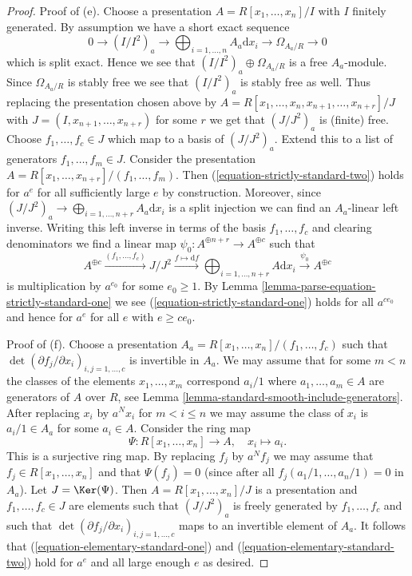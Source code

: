 \begin{proof}
\medskip\noindent
Proof of (e). Choose a presentation
$A = R[x_1, \ldots, x_n]/I$ with $I$ finitely generated.
By assumption we have a short exact sequence
$$
0 \to (I/I^2)_a \to \bigoplus\nolimits_{i = 1, \ldots, n} A_a\text{d}x_i \to
\Omega_{A_a/R} \to 0
$$
which is split exact. Hence we see that
$(I/I^2)_a \oplus \Omega_{A_a/R}$ is a free $A_a$-module.
Since $\Omega_{A_a/R}$ is stably free we see that $(I/I^2)_a$
is stably free as well. Thus replacing the presentation chosen
above by $A = R[x_1, \ldots, x_n, x_{n + 1}, \ldots, x_{n + r}]/J$ with
$J = (I, x_{n + 1}, \ldots, x_{n + r})$ for some $r$ we get that $(J/J^2)_a$
is (finite) free. Choose $f_1, \ldots, f_c \in J$ which map to a basis of
$(J/J^2)_a$. Extend this to a list of generators
$f_1, \ldots, f_m \in J$. Consider the presentation
$A = R[x_1, \ldots, x_{n + r}]/(f_1, \ldots, f_m)$.
Then (\ref{equation-strictly-standard-two}) holds for $a^e$
for all sufficiently large $e$ by construction. Moreover, since
$(J/J^2)_a \to \bigoplus\nolimits_{i = 1, \ldots, n + r} A_a\text{d}x_i$
is a split injection we can find an $A_a$-linear left inverse.
Writing this left inverse in terms of the basis $f_1, \ldots, f_c$
and clearing denominators we find a linear map
$\psi_0 : A^{\oplus n + r} \to A^{\oplus c}$ such that
$$
A^{\oplus c} \xrightarrow{(f_1, \ldots, f_c)}
J/J^2 \xrightarrow{f \mapsto \text{d}f}
\bigoplus\nolimits_{i = 1, \ldots, n + r} A \text{d}x_i
\xrightarrow{\psi_0}
A^{\oplus c}
$$
is multiplication by $a^{e_0}$ for some $e_0 \geq 1$. By
Lemma \ref{lemma-parse-equation-strictly-standard-one}
we see (\ref{equation-strictly-standard-one})
holds for all $a^{ce_0}$ and hence for $a^e$ for all $e$ with $e \geq ce_0$.

\medskip\noindent
Proof of (f). Choose a presentation
$A_a = R[x_1, \ldots, x_n]/(f_1, \ldots, f_c)$ such that
$\det(\partial f_j/\partial x_i)_{i, j = 1, \ldots, c}$
is invertible in $A_a$. We may assume that for some
$m < n$ the classes of the elements $x_1, \ldots, x_m$
correspond $a_i/1$ where $a_1, \ldots, a_m \in A$ are generators of $A$
over $R$, see Lemma \ref{lemma-standard-smooth-include-generators}.
After replacing $x_i$ by $a^Nx_i$ for $m < i \leq n$
we may assume the class of $x_i$ is $a_i/1 \in A_a$ for some
$a_i \in A$. Consider the ring map
$$
\Psi : R[x_1, \ldots, x_n] \longrightarrow A,\quad
x_i \longmapsto a_i.
$$
This is a surjective ring map. By replacing $f_j$ by $a^Nf_j$ we may
assume that $f_j \in R[x_1, \ldots, x_n]$ and that
$\Psi(f_j) = 0$ (since after all $f_j(a_1/1, \ldots, a_n/1) = 0$
in $A_a$). Let $J = \Ker(\Psi)$. Then $A = R[x_1, \ldots, x_n]/J$
is a presentation and $f_1, \ldots, f_c \in J$ are elements such that
$(J/J^2)_a$ is freely generated by $f_1, \ldots, f_c$ and such
that $\det(\partial f_j/\partial x_i)_{i, j = 1, \ldots, c}$
maps to an invertible element of $A_a$. It follows that
(\ref{equation-elementary-standard-one}) and
(\ref{equation-elementary-standard-two})
hold for $a^e$ and all large enough $e$ as desired.
\end{proof}






